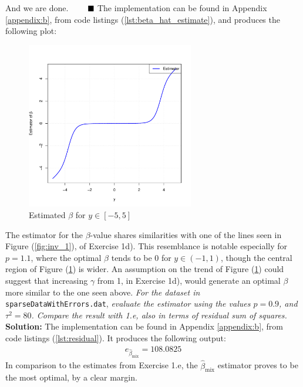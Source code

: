 And we are done. $\Q$ \spaze 
The implementation can be found in Appendix \ref{appendix:b}, from code listings (\ref{lst:beta_hat_estimate}), and produces the following plot:
\begin{figure}[H]
  \centering
  \includegraphics[width=0.65\textwidth]{Images/Figures_Exercise_3/estimator_plot.pdf}
  \caption{Estimated $\beta$ for $y \in [-5, 5]$}
  \label{fig:beta_estimator}
\end{figure}
The estimator for the $\beta$-value shares similarities with one of the lines seen in Figure (\ref{fig:inv_1}), of Exercise 1d). This resemblance is notable especially for $p = 1.1$, where the optimal $\beta$ tends to be 0 for $y \in (-1, 1)$, though the central region of Figure (\ref{fig:beta_estimator}) is wider. An assumption on the trend of Figure (\ref{fig:beta_estimator}) could suggest that increasing $\gamma$ from 1, in Exercise 1d), would generate an optimal $\beta$ more similar to the one seen above.
\emph{For the dataset in} \texttt{sparseDataWithErrors.dat}, \emph{evaluate the estimator using the
values $p = 0.9$, and $\tau^2 = 80$. Compare the result with 1.e, also in terms of residual
sum of squares.}  \spaze
\textbf{Solution:} \spaze
The implementation can be found in Appendix \ref{appendix:b}, from code listings (\ref{lst:residual}). It produces the following output:
\begin{align*}
    e_{\hat{\beta}_{\text{mix}}} = 108.0825
\end{align*}
In comparison to the estimates from Exercise 1.e, the $\hat{\beta}_{\text{mix}}$ estimator proves to be the most optimal, by a clear margin.